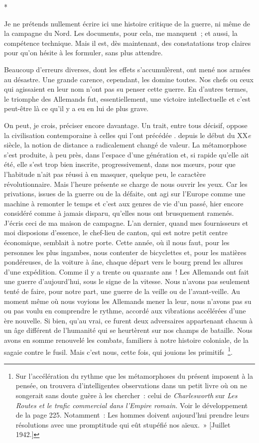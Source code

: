 \documentclass[french,twoside]{book} %
\begin{document}
\begin{center}
*\end{center}
\noindent Je ne prétends nullement écrire ici une histoire critique de la guerre, ni même de la campagne du Nord. Les documents, pour cela, me manquent ; et aussi, la compétence technique. Mais il est, dès maintenant, des constatations trop claires pour qu’on hésite à les formuler, sans plus attendre.\par
Beaucoup d’erreurs diverses, dont les effets s’accumulèrent, ont mené nos armées au désastre. Une grande carence, cependant, les domine toutes. Nos chefs ou ceux qui agissaient en leur nom n’ont pas su penser cette guerre. En d’autres termes, le   triomphe des Allemands fut, essentiellement, une victoire intellectuelle et c’est peut-être là ce qu’il y a eu en lui de plus grave.\par
On peut, je crois, préciser encore davantage. Un trait, entre tous décisif, oppose la civilisation contemporaine à celles qui l’ont précédée . depuis le début du XX\emph{e} siècle, la notion de distance a radicalement changé de valeur. La métamorphose s’est produite, à peu près, dans l’espace d’une génération et, si rapide qu’elle ait été, elle s’est trop bien inscrite, progressivement, dans nos mœurs, pour que l’habitude n’ait pas réussi à en masquer, quelque peu, le caractère révolutionnaire. Mais l’heure présente se charge de nous ouvrir les yeux. Car les privations, issues de la guerre ou de la défaite, ont agi sur l’Europe comme une machine à remonter le temps et c’est aux genres de vie d’un passé, hier encore considéré comme à jamais disparu, qu’elles nous ont brusquement ramenés. J’écris ceci de ma maison de campagne. L’an dernier, quand mes fournisseurs et moi disposions d’essence, le chef-lieu de canton, qui est notre petit centre économique, semblait à notre porte. Cette année, où il nous faut, pour les personnes les plus ingambes, nous contenter de bicyclettes et, pour les matières pondéreuses, de la voiture à âne, chaque départ vers le bourg prend les allures d’une expédition. Comme il y a trente ou quarante ans ! Les Allemands ont fait une guerre d’aujourd’hui, sous le signe de la vitesse. Nous n’avons pas seulement tenté de faire, pour notre part, une guerre de la veille ou de l’avant-veille. Au moment même où nous voyions les Allemands mener la leur, nous n’avons pas su ou pas voulu en comprendre le rythme, accordé aux vibrations accélérées d’une ère nouvelle. Si bien, qu’au vrai, ce furent deux adversaires appartenant chacun à un âge différent de l’humanité qui se heurtèrent sur nos champs de bataille. Nous avons en somme renouvelé les combats, familiers à notre histoire coloniale, de la   sagaie contre le fusil. Mais c’est nous, cette fois, qui jouions les primitifs \footnote{ Sur l’accélération du rythme que les métamorphoses du présent imposent à la pensée, on trouvera d’intelligentes observations dans un petit livre où on ne songerait sans doute guère à les chercher : celui de \emph{Charlesworth} sur \emph{Les Routes et le trafic commercial dans l’Empire romain.} Voir le développement de la page 225. Notamment : Les hommes doivent aujourd’hui prendre leurs résolutions avec une promptitude qui eût stupéfié nos aïeux. » [Juillet 1942.]}.\par
\end{document}
